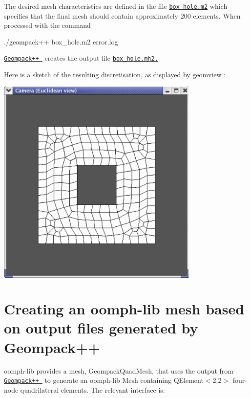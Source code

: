 The desired mesh characteristics are defined in the file \href{../../../../demo_drivers/meshing/mesh_from_geompack/box_hole.m2}{\tt box\+\_\+hole.\+m2} which specifies that the final mesh should contain approximately 200 elements. When processed with the command 
\begin{DoxyCode}
./geompack++ box\_hole.m2 error.log
\end{DoxyCode}
 \href{http://members.shaw.ca/bjoe/}{\tt {\ttfamily Geompack++ }} creates the output file \href{../../../../demo_drivers/meshing/mesh_from_geompack/box_hole.mh2}{\tt box\+\_\+hole.\+mh2.}

Here is a sketch of the resulting discretisation, as displayed by {\ttfamily geomview} \+:

 
\begin{DoxyImage}
\includegraphics[width=0.75\textwidth]{geomview_box_screenshot}
\end{DoxyImage}




\hypertarget{index_oomph_use}{}\section{Creating an oomph-\/lib mesh based on output files generated by Geompack++}\label{index_oomph_use}
{\ttfamily oomph-\/lib} provides a mesh, {\ttfamily Geompack\+Quad\+Mesh}, that uses the output from \href{http://members.shaw.ca/bjoe/}{\tt {\ttfamily Geompack++} } to generate an {\ttfamily oomph-\/lib} Mesh containing {\ttfamily Q\+Element$<$2,2$>$} four-\/node quadrilateral elements. The relevant interface is\+:

